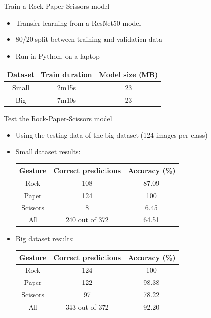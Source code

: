 \begin{frame}{Train a Rock-Paper-Scissors model}
  \begin{itemize}
	\item Transfer learning from a ResNet50 model
	\item 80/20 split between training and validation data
	\item Run in Python, on a laptop
  \end{itemize}
  \begin{table}
	\begin{tabular}{|c|c|c|}
	  \hline
		\textbf{Dataset} & \textbf{Train duration} & \textbf{Model size (MB)} \\
	  \hline
		Small & 2m15s & 23 \\
	  \hline
		Big & 7m10s & 23 \\
	  \hline
	\end{tabular}
  \end{table}
\end{frame}

\begin{frame}{Test the Rock-Paper-Scissors model}
  \begin{itemize}
	\item Using the testing data of the big dataset (124 images per class)
	\item Small dataset results:
  \begin{table}
	\begin{tabular}{|c|c|c|}
	  \hline
		\textbf{Gesture} & \textbf{Correct predictions} & \textbf{Accuracy (\%)} \\
	  \hline
		Rock & 108 & 87.09 \\
	  \hline
		Paper & 124 & 100 \\
	  \hline
		Scissors & 8 & 6.45 \\
	  \hline
	  \hline
		All & 240 out of 372 & 64.51 \\
	  \hline
	\end{tabular}
  \end{table}
	\item Big dataset results:
  \begin{table}
	\begin{tabular}{|c|c|c|}
	  \hline
		\textbf{Gesture} & \textbf{Correct predictions} & \textbf{Accuracy (\%)} \\
	  \hline
		Rock & 124 & 100 \\
	  \hline
		Paper & 122 & 98.38 \\
	  \hline
		Scissors & 97 & 78.22 \\
	  \hline
	  \hline
		All & 343 out of 372 & 92.20 \\
	  \hline
	\end{tabular}
  \end{table}
  \end{itemize}
\end{frame}


